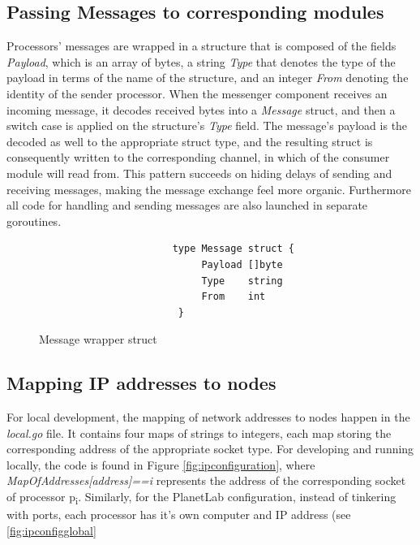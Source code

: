 \documentclass[12pt,a4paper]{report}
\begin{document}
	        \subsection{Passing Messages to corresponding modules}
	            Processors' messages are wrapped in a structure that is composed of the fields \textit{Payload}, which is an array of bytes, a string \textit{Type} that denotes the type of the payload in terms of the name of the structure, and an integer \textit{From} denoting the identity of the sender processor. When the messenger component receives an incoming message, it decodes received bytes into a \textit{Message} struct, and then a switch case is applied on the structure's \textit{Type} field. The message's payload is the decoded as well to the appropriate struct type, and the resulting struct is consequently written to the corresponding channel, in which of the consumer module will read from. This pattern succeeds on hiding delays of sending and receiving messages, making the message exchange feel more organic. Furthermore all code for handling and sending messages are also launched in separate goroutines.
	            \begin{figure}
	                \centering
	                \begin{lstlisting}
	                   type Message struct {
                        	Payload []byte
                        	Type    string
                        	From    int
                        }
	                \end{lstlisting}
	                \caption{Message wrapper struct}
	                \label{fig:messagestruct}
	            \end{figure}
	            		

	        \subsection{Mapping IP addresses to nodes}
	            For local development, the mapping of network addresses to nodes happen in the \textit{local.go} file. It contains four maps of strings to integers, each map storing the corresponding address of the appropriate socket type. For developing and running locally, the code is found in Figure \ref{fig:ipconfiguration}, where \textit{MapOfAddresses[address]==i} represents the address of the corresponding socket of processor p\textsubscript{i}. Similarly, for the PlanetLab configuration, instead of tinkering with ports, each processor has it's own computer and IP address (see \ref{fig:ipconfigglobal}
	            
\end{document}
